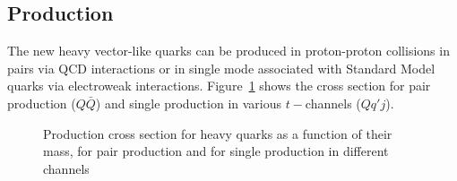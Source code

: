 

\subsection{Production}\label{sec:vlqprod}

The new heavy vector-like quarks can be produced in
proton-proton collisions in pairs via QCD interactions
or in single mode associated with Standard Model quarks
via electroweak interactions.
Figure~\ref{fig:vlqxsec} shows the cross section for
pair production ($Q\bar{Q}$) and single production 
in various $t-$channels ($Qq'j$).

\begin{figure}[hbt]\begin{center}
\myskip
	\caption{Production cross section for heavy quarks as 
          a function of their mass, for pair production and
          for single production in different 
          channels~\cite{Aguilar-Saavedra:2013qpa}\label{fig:vlqxsec}}
\end{center}\end{figure}


